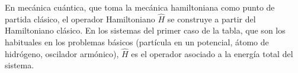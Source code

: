 \documentclass[
  spanish,
]{article}
\begin{document}
En mecánica cuántica, que toma la mecánica hamiltoniana como punto de
partida clásico, el operador Hamiltoniano \(\hat{H}\) se construye a
partir del Hamiltoniano clásico. En los sistemas del primer caso de la
tabla, que son los habituales en los problemas básicos (partícula en un
potencial, átomo de hidrógeno, oscilador armónico), \(\hat{H}\) es el
operador asociado a la energía total del sistema.

~
\end{document}
